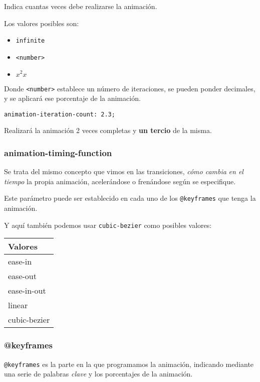 \documentclass[11pt]{article}
\begin{document}
Indica cuantas veces debe realizarse la animación.

Los valores posibles son:

\begin{itemize}
\item \verb~infinite~
\item \verb~<number>~
\item $x^2x$
\end{itemize}

Donde \verb~<number>~ establece un número de iteraciones, se pueden ponder decimales,
y se aplicará ese porcentaje de la animación.

\begin{verbatim}
animation-iteration-count: 2.3;
\end{verbatim}

Realizará la animación 2 veces completas y \textbf{un tercio} de la misma.

\subsubsection{animation-timing-function}
\label{sec-1-2-4}

Se trata del mismo concepto que vimos en las transiciones, \emph{cómo cambia}
\emph{en el tiempo} la propia animación, acelerándose o frenándose según se
especifique.

Este parámetro puede ser establecido en cada uno de los \verb~@keyframes~ que tenga
la animación.

Y aquí también podemos usar \verb~cubic-bezier~ como posibles valores:

\begin{center}
\begin{tabular}{l}
Valores\\
\hline
ease-in\\
ease-out\\
ease-in-out\\
linear\\
cubic-bezier\\
\end{tabular}
\end{center}


\subsubsection{@keyframes}
\label{sec-1-2-5}

\verb~@keyframes~ es la parte en la que programamos la animación, indicando mediante
una serie de palabras \emph{clave} y los porcentajes de la animación.
\end{document}
